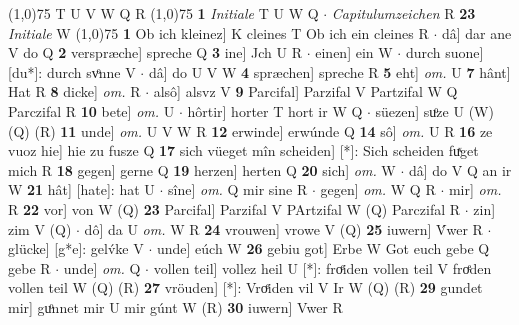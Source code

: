 \documentclass[8pt,a4paper,notitlepage]{article}
\begin{document}
\begin{table}[ht]
\begin{minipage}[t]{0.5\linewidth}
\scriptsize
\line(1,0){75} \newline
T U V W Q R \newline
\line(1,0){75} \newline
\textbf{1} \textit{Initiale} T U W Q   $\cdot$ \textit{Capitulumzeichen} R  \textbf{23} \textit{Initiale} W  \newline
\line(1,0){75} \newline
\textbf{1} Ob ich kleinez] K cleines T Ob ich ein cleines R  $\cdot$ dâ] dar ane V do Q \textbf{2} verspræche] spreche Q \textbf{3} ine] Jch U R  $\cdot$ einen] ein W  $\cdot$ durch suone] [du*]: durch svͦnne V  $\cdot$ dâ] do U V W \textbf{4} spræchen] spreche R \textbf{5} eht] \textit{om.} U \textbf{7} hânt] Hat R \textbf{8} dicke] \textit{om.} R  $\cdot$ alsô] alsvz V \textbf{9} Parcifal] Parzifal V Partzifal W Q Parczifal R \textbf{10} bete] \textit{om.} U  $\cdot$ hôrtir] horter T hort ir W Q  $\cdot$ süezen] suͦze U (W) (Q) (R) \textbf{11} unde] \textit{om.} U V W R \textbf{12} erwinde] erwúnde Q \textbf{14} sô] \textit{om.} U R \textbf{16} ze vuoz hie] hie zu fusze Q \textbf{17} sich vüeget mîn scheiden] [*]: Sich scheiden fuͯget mich R \textbf{18} gegen] gerne Q \textbf{19} herzen] herten Q \textbf{20} sich] \textit{om.} W  $\cdot$ dâ] do V Q an ir W \textbf{21} hât] [hate]: hat U  $\cdot$ sîne] \textit{om.} Q mir sine R  $\cdot$ gegen] \textit{om.} W Q R  $\cdot$ mir] \textit{om.} R \textbf{22} vor] von W (Q) \textbf{23} Parcifal] Parzifal V PArtzifal W (Q) Parczifal R  $\cdot$ zin] zim V (Q)  $\cdot$ dô] da U \textit{om.} W R \textbf{24} vrouwen] vrowe V (Q) \textbf{25} iuwern] V́wer R  $\cdot$ glücke] [g*e]: gelv́ke V  $\cdot$ unde] eúch W \textbf{26} gebiu got] Erbe W Got euch gebe Q gebe R  $\cdot$ unde] \textit{om.} Q  $\cdot$ vollen teil] vollez heil U [*]: froͤiden vollen teil V froͤden vollen teil W (Q) (R) \textbf{27} vröuden] [*]: Vroͤiden vil V Ir W (Q) (R) \textbf{29} gundet mir] guͦnnet mir U mir gúnt W (R) \textbf{30} iuwern] Vwer R \newline
\end{minipage}
\end{table}
\end{document}
